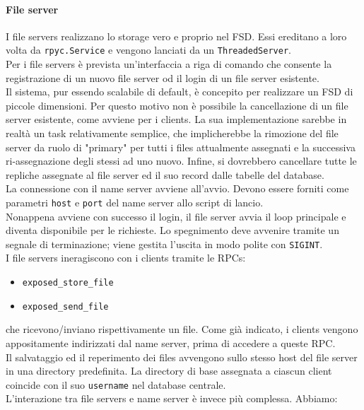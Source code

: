 \documentclass[a4paper, 12pt]{scrreprt}
\begin{document}
        \paragraph{File server}

            I file servers realizzano lo storage vero e proprio nel FSD. Essi ereditano a loro volta da \texttt{rpyc.Service} e vengono lanciati da un \texttt{ThreadedServer}.\\
            Per i file servers è prevista un'interfaccia a riga di comando che consente la registrazione di un nuovo file server od il login di un file server esistente.\\
            Il sistema, pur essendo scalabile di default, è concepito per realizzare un FSD di piccole dimensioni. Per questo motivo non è possibile la cancellazione di un file server esistente, come avviene per i clients. La sua implementazione sarebbe in realtà un task relativamente semplice, che implicherebbe la rimozione del file server da ruolo di "primary" per tutti i files attualmente assegnati e la successiva ri-assegnazione degli stessi ad uno nuovo. Infine, si dovrebbero cancellare tutte le repliche assegnate al file server ed il suo record dalle tabelle del database.\\
            La connessione con il name server avviene all'avvio. Devono essere forniti come parametri \texttt{host} e \texttt{port} del name server allo script di lancio.\\
            Nonappena avviene con successo il login, il file server avvia il loop principale e diventa disponibile per le richieste. Lo spegnimento deve avvenire tramite un segnale di terminazione; viene gestita l'uscita in modo polite con \texttt{SIGINT}.\\
            I file servers ineragiscono con i clients tramite le RPCs:

            \begin{itemize}

                \item \texttt{exposed\_store\_file}

                \item \texttt{exposed\_send\_file}

            \end{itemize}

            che ricevono/inviano rispettivamente un file. Come già indicato, i clients vengono appositamente indirizzati dal name server, prima di accedere a queste RPC.\\
            Il salvataggio ed il reperimento dei files avvengono sullo stesso host del file server in una directory predefinita. La directory di base assegnata a ciascun client coincide con il suo \texttt{username} nel database centrale.\\
            L'interazione tra file servers e name server è invece più complessa. Abbiamo:
\end{document}
